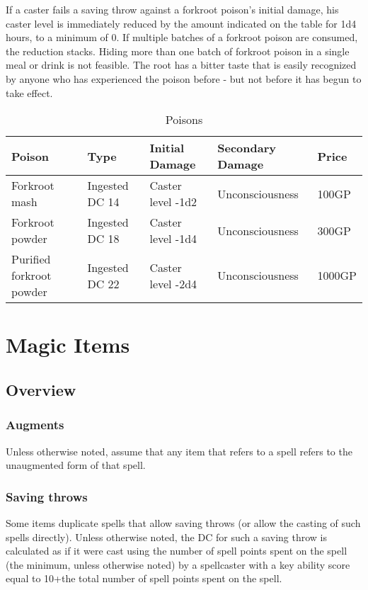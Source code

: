 If a caster fails a saving throw against a forkroot poison's initial damage, his caster level is immediately reduced by the amount indicated on the  table for 1d4 hours, to a minimum of 0. 
If multiple batches of a forkroot poison are consumed, the reduction stacks.
Hiding more than one batch of forkroot poison in a single meal or drink is not feasible.
The root has a bitter taste that is easily recognized by anyone who has experienced the poison before - but not before it has begun to take effect.
\begin{table*}
\label{tab:Poisons}
\caption{Poisons}
\centering
\begin{tabular}{lllll}
\toprule
\textbf{Poison}		&\textbf{Type}	&\textbf{Initial Damage}&\textbf{Secondary Damage}	&\textbf{Price}\\
\midrule
Forkroot mash		&Ingested DC 14	&Caster level -1d2	&Unconsciousness		&100GP\\
Forkroot powder		&Ingested DC 18	&Caster level -1d4	&Unconsciousness		&300GP\\
Purified forkroot powder&Ingested DC 22	&Caster level -2d4	&Unconsciousness		&1000GP\\
\bottomrule
\end{tabular}

\end{table*}
\section{Magic Items}
\subsection{Overview}
\subsubsection{Augments}
Unless otherwise noted, assume that any item that refers to a spell refers to the unaugmented form of that spell.
\subsubsection{Saving throws}
Some items duplicate spells that allow saving throws (or allow the casting of such spells directly). Unless otherwise noted, the DC for such a saving throw is calculated as if it were cast using the number of spell points spent on the spell (the minimum, unless otherwise noted) by a spellcaster with a key ability score equal to 10+the total number of spell points spent on the spell.

